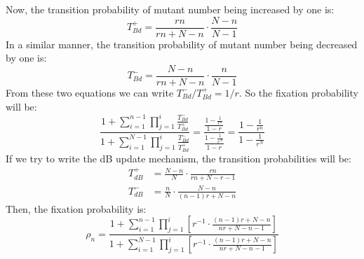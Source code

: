 \documentclass{article}
\begin{document}
Now, the transition probability of mutant number being increased by one is:
\begin{equation}
T_{Bd}^+ = \frac{rn}{rn+ N-n} \cdot \frac{N-n}{N-1} \label{eq:51}
\end{equation}
In a similar manner, the transition probability of mutant number being decreased by one is:
\begin{equation}
T_{Bd}^- = \frac{N-n}{rn+ N-n} \cdot \frac{n}{N-1} \label{eq:52}
\end{equation}
From these two equations we can write $T_{Bd}^-/T_{Bd}^+ = 1/r$. So the fixation probability will be:
\begin{equation}
\frac{1+\sum_{i=1}^{n-1}\prod_{j=1}^i \frac{T_{Bd}^-}{T_{Bd}^+}}{1+ \sum_{i=1}^{N-1}\prod_{j=1}^i \frac{T_{Bd}^-}{T_{Bd}^+}} = \frac{\frac{1-\frac{1}{r^n}}{1-r}} {\frac{1-\frac{1}{r^N}}{1-r}} = \frac{1-\frac{1}{r^n}}{1-\frac{1}{r^N}} \label{eq:53}
\end{equation}
If we try to write the dB update mechanism, the transition probabilities will be:
\begin{align}
T_{dB}^+ &= \frac{N-n}{N} \cdot \frac{rn}{rn+N-r-1} \nonumber\\
T_{dB}^- &= \frac{n}{N} \cdot \frac{N-n}{(n-1)r + N-n} \label{eq:54}
\end{align}
Then, the fixation probability is:
\begin{equation}
\rho_n = \frac{1 + \sum_{i=1}^{n-1} \prod_{j=1}^i[ r^{-1} \cdot \frac{(n-1)r + N - n}{n r + N - n - 1}]}{1 + \sum_{i=1}^{N-1} \prod_{j=1}^i[ r^{-1} \cdot \frac{(n-1)r + N - n}{n r + N - n - 1}]} \label{eq:55}
\end{equation}
\end{document}
